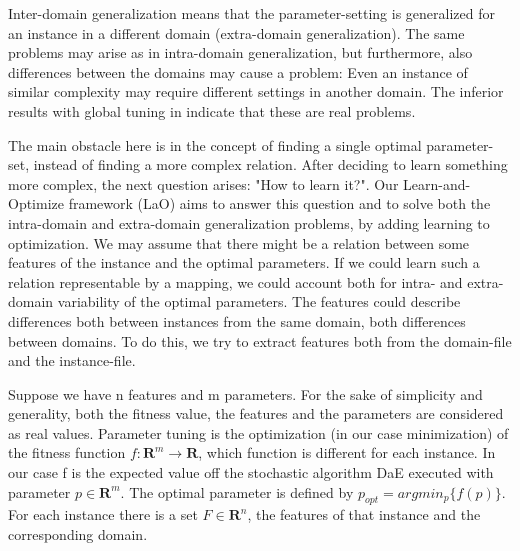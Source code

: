 \documentclass{acm_proc_article-sp}
\begin{document}
Inter-domain generalization means that the parameter-setting is generalized for an instance in a different domain (extra-domain generalization). The same problems may arise as in intra-domain generalization, but furthermore, also differences between the domains may cause a problem: Even an instance of similar complexity may require different settings in another domain. The inferior results with global tuning in \cite{BibGECCO:2010} indicate that these are real problems.

The main obstacle here is in the concept of finding a single optimal parameter-set, instead of finding a more complex relation. After deciding to learn something more complex, the next question arises: "How to learn it?". Our Learn-and-Optimize framework (LaO) aims to answer this question and to solve both the intra-domain and extra-domain generalization problems, by adding learning to optimization. We may assume that there might be a relation between some features of the instance and the optimal parameters. If we could learn such a relation representable by a mapping, we could account both for intra- and extra-domain variability of the optimal parameters. The features could describe differences both between instances from the same domain, both differences between domains. To do this, we try to extract features both from the domain-file and the instance-file.

Suppose we have n features and m parameters. For the sake of simplicity and generality, both the fitness value, the features and the parameters are considered as real values. Parameter tuning is the optimization (in our case minimization) of the fitness function \begin{math}f:\mathbf{R}^m\to \mathbf{R} \end{math}, which function is different for each instance. In our case f is the expected value off the stochastic algorithm DaE executed with parameter \begin{math} p \in \mathbf{R}^m \end{math}. The optimal parameter is defined by \begin{math} p_{opt}=argmin_p\{f(p)\} \end{math}. For each instance there is a set \begin{math} F \in \mathbf{R}^n \end{math}, the features of that instance and the corresponding domain. 
\end{document}
